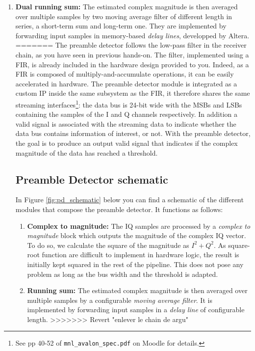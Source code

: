 \begin{enumerate}
    \item \textbf{Dual running sum: } The estimated complex magnitude is then averaged over multiple samples by two moving average filter of different length in series, a short-term sum and long-term one. They are implemented by forwarding input samples in  memory-based \textit{delay lines}, developped by Altera.
=======
The preamble detector follows the low-pass filter in the receiver chain, as you have seen in previous hands-on. The filter, implemented using a FIR, is already included in the hardware design provided to you. Indeed, as a FIR is composed of multiply-and-accumulate operations, it can be easily accelerated in hardware. The preamble detector module is integrated as a custom IP inside the same subsystem as the FIR, it therefore shares the same streaming interfaces\footnote{See pp 40-52 of \texttt{mnl\_avalon\_spec.pdf} on Moodle for details.}: the data bus is 24-bit wide with the MSBs and LSBs containing the samples of the I and Q channels respectively. In addition a valid signal is associated with the streaming data to indicate whether the data bus contains information of interest, or not. With the preamble detector, the goal is to produce an output valid signal that indicates if the complex magnitude of the data has reached a threshold.

\subsection{Preamble Detector schematic}
In Figure \ref{fig:pd_schematic} below you can find a schematic of the different modules that compose the preamble detector. It functions as follows:
\begin{enumerate}
    \item \textbf{Complex to magnitude: } The IQ samples are processed by a \textit{complex to magnitude} block which outputs the magnitude of the complex IQ vector.
    To do so, we calculate the square of the magnitude as $I^2+Q^2$. As square-root function are difficult to implement in hardware logic, the result is initially kept squared in the rest of the pipeline. This does not pose any problem as long as the bus width and the threshold is adapted.

    \item \textbf{Running sum: } The estimated complex magnitude is then averaged over multiple samples by a configurable \textit{moving average filter}. It is implemented by forwarding input samples in a \textit{delay line} of configurable length.
>>>>>>> Revert "enlever le chain de argu"


\end{enumerate}
\end{enumerate}
